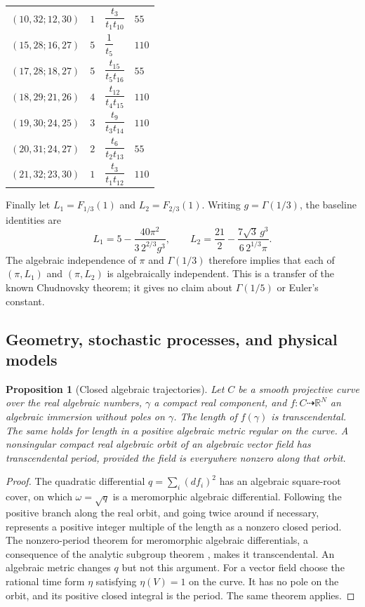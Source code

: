\documentclass[11pt,a4paper]{article}
\newtheorem{proposition}[theorem]{Proposition}
\theoremstyle{definition}
\theoremstyle{remark}
\numberwithin{equation}{section}
\begin{document}
\begin{longtable}{@{}llll@{}}
$(10,32;12,30)$ & $1$ & $\dfrac{t_{3}}{t_{1}t_{10}}$ & $55$\\
$(15,28;16,27)$ & $5$ & $\dfrac{1}{t_{5}}$ & $110$\\
$(17,28;18,27)$ & $5$ & $\dfrac{t_{15}}{t_{5}t_{16}}$ & $55$\\
$(18,29;21,26)$ & $4$ & $\dfrac{t_{12}}{t_{4}t_{15}}$ & $110$\\
$(19,30;24,25)$ & $3$ & $\dfrac{t_{9}}{t_{3}t_{14}}$ & $110$\\
$(20,31;24,27)$ & $2$ & $\dfrac{t_{6}}{t_{2}t_{13}}$ & $55$\\
$(21,32;23,30)$ & $1$ & $\dfrac{t_{3}}{t_{1}t_{12}}$ & $110$\\
\end{longtable}
\endgroup

Finally let $L_1=F_{1/3}(1)$ and $L_2=F_{2/3}(1)$.  Writing $g=\Gamma(1/3)$, the baseline identities are
\[
 L_1=5-\frac{40\pi^2}{3\,2^{2/3}g^3},\qquad
 L_2=\frac{21}{2}-\frac{7\sqrt3\,g^3}{6\,2^{1/3}\pi}.
\]
The algebraic independence of $\pi$ and $\Gamma(1/3)$ therefore implies
that each of $(\pi,L_1)$ and $(\pi,L_2)$ is algebraically independent.
This is a transfer of the known Chudnovsky theorem; it gives no claim
about $\Gamma(1/5)$ or Euler's constant.
\label{tf-gamma-pairs}

\subsection{Geometry, stochastic processes, and physical models}
\label{tf-physics-section}

\begin{proposition}[Closed algebraic trajectories]\label{tf-closed-curves}
Let $C$ be a smooth projective curve over the real algebraic numbers,
$\gamma$ a compact real component, and
$f:C\dashrightarrow\mathbb R^N$ an algebraic immersion without poles
on $\gamma$.  The length of $f(\gamma)$ is transcendental.  The same
holds for length in a positive algebraic metric regular on the curve.
A nonsingular compact real algebraic orbit of an algebraic vector
field has transcendental period, provided the field is everywhere
nonzero along that orbit.
\end{proposition}
\begin{proof}
The quadratic differential $q=\sum_i(df_i)^2$ has an algebraic
square-root cover, on which $\omega=\sqrt q$ is a meromorphic algebraic
differential.  Following the positive branch along the real orbit,
and going twice around if necessary, represents a positive integer
multiple of the length as a nonzero closed period.
The nonzero-period theorem for meromorphic algebraic differentials,
a consequence of the analytic subgroup theorem
\cite{lm-HuberWustholz}, makes it transcendental.
An algebraic metric changes $q$ but not this argument.
For a vector field choose the rational time form $\eta$ satisfying
$\eta(V)=1$ on the curve.  It has no pole on the orbit, and its positive
closed integral is the period.  The same theorem applies.
\end{proof}
\end{document}
